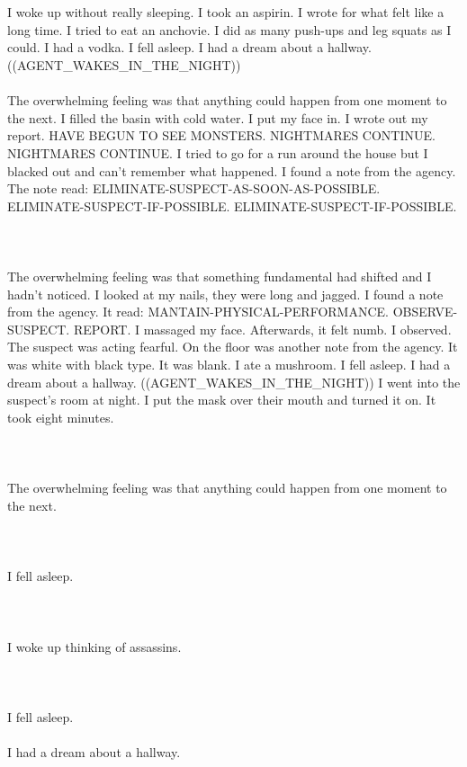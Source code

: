 \documentclass{article}
\begin{document}
    \section{}
    I woke up without really sleeping. I took an aspirin. I wrote for what felt like a long time. I tried to eat an anchovie. I did as many push-ups and leg squats as I could. I had a vodka. I fell asleep. I had a dream about a hallway. ((AGENT_WAKES_IN_THE_NIGHT)) \\\\The overwhelming feeling was that anything could happen from one moment to the next. I filled the basin with cold water. I put my face in. I wrote out my report. HAVE BEGUN TO SEE MONSTERS. NIGHTMARES CONTINUE. NIGHTMARES CONTINUE. I tried to go for a run around the house but I blacked out and can't remember what happened. I found a note from the agency. The note read: ELIMINATE-SUSPECT-AS-SOON-AS-POSSIBLE. ELIMINATE-SUSPECT-IF-POSSIBLE. ELIMINATE-SUSPECT-IF-POSSIBLE. \\\\
    \newpage
    
    \section{}
    The overwhelming feeling was that something fundamental had shifted and I hadn't noticed. I looked at my nails, they were long and jagged. I found a note from the agency. It read: MANTAIN-PHYSICAL-PERFORMANCE. OBSERVE-SUSPECT. REPORT. I massaged my face. Afterwards, it felt numb. I observed. The suspect was acting fearful. On the floor was another note from the agency. It was white with black type. It was blank. I ate a mushroom. I fell asleep. I had a dream about a hallway. ((AGENT_WAKES_IN_THE_NIGHT)) I went into the suspect's room at night. I put the mask over their mouth and turned it on. It took eight minutes. \\\\
    \newpage
    
    \section{}
    The overwhelming feeling was that anything could happen from one moment to the next.\\\\ 
    \newpage
    
    \section{}
    I fell asleep.\\\\ 
    \newpage
    
    \section{}
    I woke up thinking of assassins.\\\\ 
    \newpage
    
    \section{}
    I fell asleep.\\\\I had a dream about a hallway.\\\\ 
    \newpage
    
    
\end{document}
